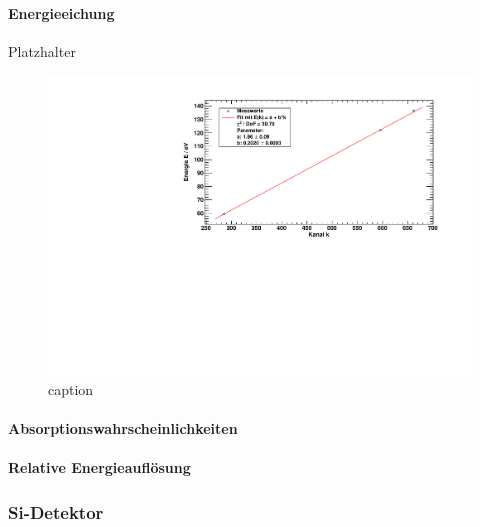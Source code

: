 \paragraph{Energieeichung}
Platzhalter
\begin{figure}[H]
\begin{center}
  \includegraphics[width=\textwidth]{../img/part3/energygauge_CdTe.pdf}
  \caption{caption}
  \label{img:cdte:energygauge}
\end{center}
\end{figure}

\paragraph{Absorptionswahrscheinlichkeiten}

\paragraph{Relative Energieauflösung}

\subsubsection{Si-Detektor}
